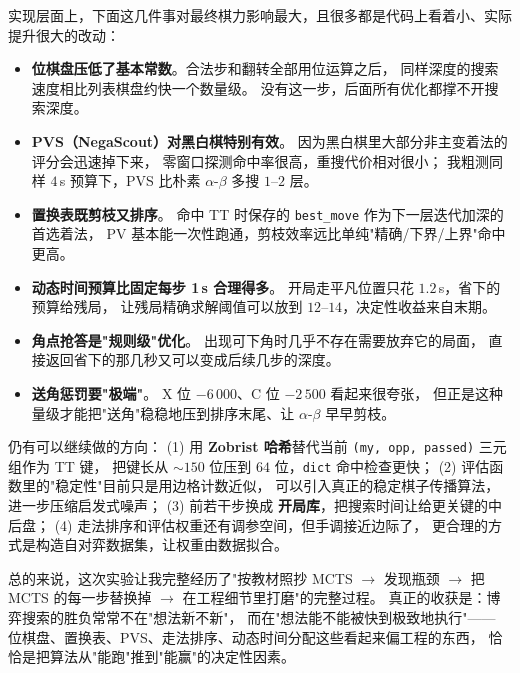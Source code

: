 \documentclass[UTF8,a4paper,11pt]{ctexart}
\begin{document}
实现层面上，下面这几件事对最终棋力影响最大，且很多都是代码上看着小、实际提升很大的改动：
\begin{itemize}[leftmargin=1.5em,itemsep=2pt]
    \item \textbf{位棋盘压低了基本常数}。合法步和翻转全部用位运算之后，
          同样深度的搜索速度相比列表棋盘约快一个数量级。
          没有这一步，后面所有优化都撑不开搜索深度。
    \item \textbf{PVS（NegaScout）对黑白棋特别有效}。
          因为黑白棋里大部分非主变着法的评分会迅速掉下来，
          零窗口探测命中率很高，重搜代价相对很小；
          我粗测同样 $4$\,s 预算下，PVS 比朴素 $\alpha$-$\beta$ 多搜 $1$--$2$ 层。
    \item \textbf{置换表既剪枝又排序}。
          命中 TT 时保存的 \texttt{best\_move} 作为下一层迭代加深的首选着法，
          PV 基本能一次性跑通，剪枝效率远比单纯"精确/下界/上界"命中更高。
    \item \textbf{动态时间预算比固定每步 1\,s 合理得多}。
          开局走平凡位置只花 $1.2$\,s，省下的预算给残局，
          让残局精确求解阈值可以放到 $12$--$14$，决定性收益来自末期。
    \item \textbf{角点抢答是"规则级"优化}。
          出现可下角时几乎不存在需要放弃它的局面，
          直接返回省下的那几秒又可以变成后续几步的深度。
    \item \textbf{送角惩罚要"极端"}。
          X 位 $-6\,000$、C 位 $-2\,500$ 看起来很夸张，
          但正是这种量级才能把"送角"稳稳地压到排序末尾、让 $\alpha$-$\beta$ 早早剪枝。
\end{itemize}

仍有可以继续做的方向：
(1) 用 \textbf{Zobrist 哈希}替代当前 \texttt{(my, opp, passed)} 三元组作为 TT 键，
把键长从 $\sim 150$ 位压到 $64$ 位，\texttt{dict} 命中检查更快；
(2) 评估函数里的"稳定性"目前只是用边格计数近似，
可以引入真正的稳定棋子传播算法，进一步压缩启发式噪声；
(3) 前若干步换成 \textbf{开局库}，把搜索时间让给更关键的中后盘；
(4) 走法排序和评估权重还有调参空间，但手调接近边际了，
更合理的方式是构造自对弈数据集，让权重由数据拟合。

总的来说，这次实验让我完整经历了"按教材照抄 MCTS $\to$ 发现瓶颈 $\to$ 把 MCTS 的每一步替换掉 $\to$ 在工程细节里打磨"的完整过程。
真正的收获是：博弈搜索的胜负常常不在"想法新不新"，
而在"想法能不能被快到极致地执行"——
位棋盘、置换表、PVS、走法排序、动态时间分配这些看起来偏工程的东西，
恰恰是把算法从"能跑"推到"能赢"的决定性因素。
\end{document}

